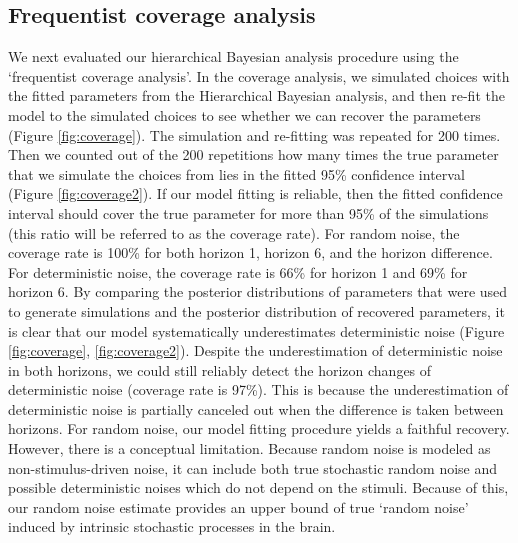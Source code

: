 \documentclass[12pt]{article}
\begin{document}
	\subsection{Frequentist coverage analysis}	
	We next evaluated our hierarchical Bayesian analysis procedure using the `frequentist coverage analysis'. In the coverage analysis, we simulated choices with the fitted parameters from the Hierarchical Bayesian analysis, and then re-fit the model to the simulated choices to see whether we can recover the parameters (Figure \ref{fig:coverage}). The simulation and re-fitting was repeated for 200 times. Then we counted out of the 200 repetitions how many times the true parameter that we simulate the choices from lies in the fitted 95\% confidence interval (Figure \ref{fig:coverage2}). If our model fitting is reliable, then the fitted confidence interval should cover the true parameter for more than 95\% of the simulations (this ratio will be referred to as the coverage rate). For random noise, the coverage rate is 100\% for both horizon 1, horizon 6, and the horizon difference. For deterministic noise, the coverage rate is 66\% for horizon 1 and 69\% for horizon 6. By comparing the posterior distributions of parameters that were used to generate simulations and the posterior distribution of recovered parameters, it is clear that our model systematically underestimates deterministic noise (Figure \ref{fig:coverage},  \ref{fig:coverage2}). Despite the underestimation of deterministic noise in both horizons, we could still reliably detect the horizon changes of deterministic noise (coverage rate is 97\%). This is because the underestimation of deterministic noise is partially canceled out when the difference is taken between horizons. For random noise, our model fitting procedure yields a faithful recovery. However, there is a conceptual limitation. Because random noise is modeled as non-stimulus-driven noise, it can include both true stochastic random noise and possible deterministic noises which do not depend on the stimuli. Because of this, our random noise estimate provides an upper bound of true `random noise' induced by intrinsic stochastic processes in the brain.
	
\end{document}
